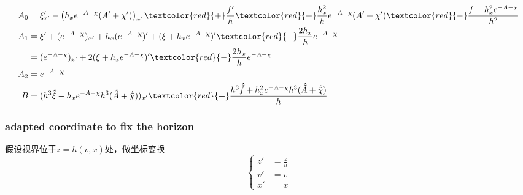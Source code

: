 \documentclass[12pt,a4paper]{ctexart}
\numberwithin{equation}{section}
\begin{document}
\begin{equation}
    \begin{aligned}
        A_0&=\xi'_{x'}-\left(h_xe^{-A-\chi}(A'+\chi')\right)_{x'}\textcolor{red}{+}\frac{f'}{h}\textcolor{red}{+}\frac{h_x^2}{h}e^{-A-\chi}(A'+\chi')\textcolor{red}{-}\frac{f-h_x^2 e^{-A-\chi}}{h^2}\\
        A_1&=\xi'+(e^{-A-\chi})_{x'}+h_x(e^{-A-\chi})'+(\xi+h_x e^{-A-\chi})'\textcolor{red}{-}\frac{2h_x}{h}e^{-A-\chi}\\
        &=(e^{-A-\chi})_{x'}+2(\xi+h_x e^{-A-\chi})'\textcolor{red}{-}\frac{2h_x}{h}e^{-A-\chi}\\
        A_2&=e^{-A-\chi}\\
        B&=(h^3\dot{\tilde{\xi}}-h_xe^{-A-\chi}h^3(\dot{\tilde{A}}+\dot{\tilde{\chi}}))_{x'}\textcolor{red}{+}\frac{h^3\dot{\tilde{f}}+h_x^2 e^{-A-\chi}h^3(\dot{\tilde{A}}+\dot{\tilde{\chi}})}{h}
    \end{aligned}
\end{equation}

\subsubsection{adapted coordinate to fix the horizon}

假设视界位于$z=h(v,x)$处，做坐标变换
\begin{equation}
    \left\{
        \begin{aligned}
            z'&=\frac{z}{h}\\
            v'&=v\\
            x'&=x
        \end{aligned}
    \right.
\end{equation}
\end{document}
